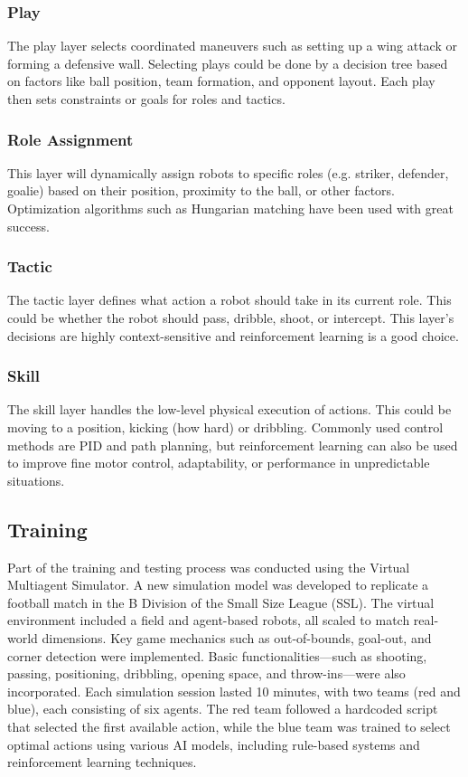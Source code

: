 \subsubsection{Play}
The play layer selects coordinated maneuvers such as setting up a wing attack or forming a defensive wall. Selecting plays could be done by a decision tree based on factors like ball position, team formation, and opponent layout. Each play then sets constraints or goals for roles and tactics.

\subsubsection{Role Assignment}
This layer will dynamically assign robots to specific roles (e.g. striker, defender, goalie) based on their position, proximity to the ball, or other factors.
Optimization algorithms such as Hungarian matching have been used with great success.

\subsubsection{Tactic}
The tactic layer defines what action a robot should take in its current role.
This could be whether the robot should pass, dribble, shoot, or intercept.
This layer's decisions are highly context-sensitive and reinforcement learning is a good choice.

\subsubsection{Skill}
The skill layer handles the low-level physical execution of actions.
This could be moving to a position, kicking (how hard) or dribbling. Commonly used control methods are PID and path planning, but reinforcement learning can also be used to improve fine motor control, adaptability, or performance in unpredictable situations.

\subsection{Training}
Part of the training and testing process was conducted using the Virtual Multiagent Simulator. A new simulation model was developed to replicate a football match in the B Division of the Small Size League (SSL). The virtual environment included a field and agent-based robots, all scaled to match real-world dimensions. Key game mechanics such as out-of-bounds, goal-out, and corner detection were implemented. Basic functionalities—such as shooting, passing, positioning, dribbling, opening space, and throw-ins—were also incorporated. Each simulation session lasted 10 minutes, with two teams (red and blue), each consisting of six agents. The red team followed a hardcoded script that selected the first available action, while the blue team was trained to select optimal actions using various AI models, including rule-based systems and reinforcement learning techniques.

